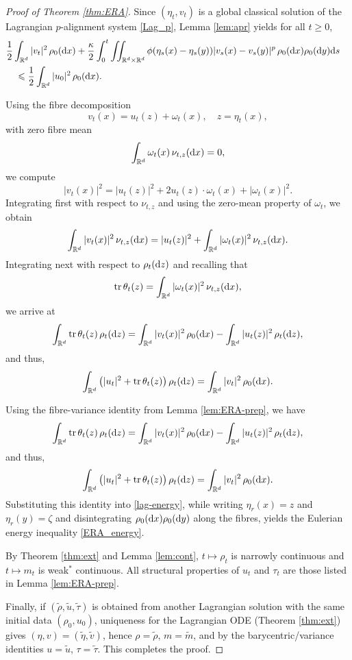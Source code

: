 \documentclass[10pt,reqno]{amsart}
\renewcommand{\geq}{\geqslant}
\renewcommand{\le}{\leqslant}
\numberwithin{equation}{section}
\newcommand{\R}{\mathbb R}
\newcommand{\intr}{\int_{\R^d}}
\newcommand{\intrr}{\iint_{\R^d \times \R^d}}
\newcommand{\dx}{\textnormal{d}x}
\newcommand{\dy}{\textnormal{d}y}
\newcommand{\dz}{\textnormal{d}z}
\newcommand{\ds}{\textnormal{d}s}
\newcommand{\tr}{\textnormal{tr}}
\begin{document}
\begin{proof}[Proof of Theorem \ref{thm:ERA}]
\medskip
{} 
Since $(\eta_t,v_t)$ is a global classical solution of the Lagrangian $p$-alignment system \eqref{Lag_p}, Lemma \ref{lem:apr} yields for all $t\geq 0$,
\begin{align}\label{lag-energy}
\begin{aligned}
&\frac12 \intr |v_t|^2\,\rho_0(\dx)+\frac{\kappa}{2} \int_0^t \intrr
\phi(\eta_s(x)-\eta_s(y)) |v_s(x)-v_s(y)|^p\,\rho_0(\dx)\rho_0(\dy)\ds \cr
&\quad \le \frac12 \intr |u_0|^2\,\rho_0(\dx).
\end{aligned}
\end{align}
 
Using the fibre decomposition
\[
v_t(x)=u_t(z)+\omega_t(x), \quad z=\eta_t(x),
\]
with zero fibre mean
\[
\intr \omega_t(x)\,\nu_{t,z}(\dx)=0,
\]
we compute
\[
|v_t(x)|^2=|u_t(z)|^2+2u_t(z)\cdot \omega_t(x)+|\omega_t(x)|^2.
\]
Integrating first with respect to $\nu_{t,z}$ and using the zero-mean property of $\omega_t$, we obtain
\[
\intr |v_t(x)|^2\,\nu_{t,z}(\dx) = |u_t(z)|^2 + \intr |\omega_t(x)|^2\,\nu_{t,z}(\dx).
\]
Integrating next with respect to $\rho_t(\dz)$ and recalling that
\[
\tr\,\theta_t(z)=\intr|\omega_t(x)|^2\,\nu_{t,z}(\dx),
\]
we arrive at
\begin{equation}\label{eq:v-decompose}
\intr  \tr\,\theta_t(z)\, \rho_t(\dz) = \intr |v_t(x)|^2\,\rho_0(\dx) - \intr |u_t(z)|^2\,\rho_t(\dz),
\end{equation}
and thus,
\[
\intr \left(|u_t|^2 + \tr\,\theta_t(z)\right)\rho_t(\dz) = \intr|v_t|^2\,\rho_0(\dx).
\]
 

Using the fibre-variance identity from Lemma \ref{lem:ERA-prep}, we have
\begin{equation}\label{eq:v-decompose}
\intr  {\rm tr}\,\theta_t(z)\, \rho_t(\dz) = \intr |v_t(x)|^2\,\rho_0(\dx) - \intr |u_t(z)|^2\,\rho_t(\dz),
\end{equation}
and thus,
\[
\intr \left(|u_t|^2+{\rm tr}\,\theta_t(z)\right)\rho_t(\dz) = \intr|v_t|^2\,\rho_0(\dx).
\]
Substituting this identity into \eqref{lag-energy}, while writing $\eta_r(x)=z$ and $\eta_r(y)=\zeta$ and disintegrating $\rho_0(\dx)\rho_0(\dy)$ along the fibres, yields the Eulerian energy inequality \eqref{ERA_energy}.

\medskip
{}
By Theorem \ref{thm:ext} and Lemma \ref{lem:cont},  $t\mapsto \rho_t$ is narrowly continuous and $t\mapsto m_t$ is weak$^\ast$ continuous. All structural properties of $u_t$ and $\tau_t$ are those listed in Lemma \ref{lem:ERA-prep}.

Finally, if $(\tilde\rho,\tilde u,\tilde\tau)$ is obtained from another Lagrangian solution with the same initial data $(\rho_0,u_0)$, uniqueness for the Lagrangian ODE (Theorem \ref{thm:ext}) gives $(\eta,v)=(\tilde\eta,\tilde v)$, hence $\rho=\tilde\rho$, $m=\tilde m$, and by the barycentric/variance identities $u=\tilde u$, $\tau=\tilde\tau$. This completes the proof.
\end{proof}
 
\end{document}

